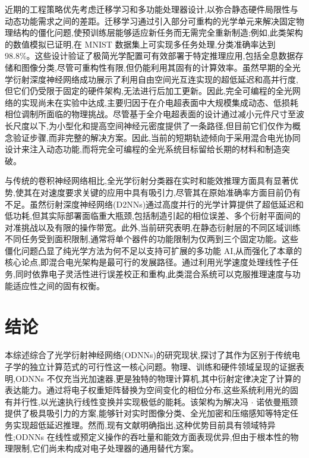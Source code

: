 近期的工程策略优先考虑迁移学习和多功能处理器设计,以弥合静态硬件局限性与动态功能需求之间的差距。迁移学习通过引入部分可重构的光学单元来解决固定物理结构的僵化问题,使预训练层能够适应新任务而无需完全重新制造;例如,此类架构的数值模拟已证明,在 MNIST 数据集上可实现多任务处理,分类准确率达到 98.8\%。这些设计验证了极简光学配置可有效部署于特定推理应用,包括全息数据存储和图像分类,尽管可重构性有限,但仍能利用其固有的计算效率。虽然早期的全光学衍射深度神经网络成功展示了利用自由空间光互连实现的超低延迟和高并行度,但它们仍受限于固定的硬件架构,无法进行后加工更新。因此,完全可编程的全光网络的实现尚未在实验中达成,主要归因于在介电超表面中大规模集成动态、低损耗相位调制所面临的物理挑战。尽管基于全介电超表面的设计通过减小元件尺寸至波长尺度以下,为小型化和提高空间神经元密度提供了一条路径,但目前它们仅作为概念验证步骤,而非完整的解决方案。因此,当前的短期轨迹倾向于采用混合电光协同设计来注入动态功能,而将完全可编程的全光系统目标留给长期的材料和制造突破。\citep{doi_10_1117_12_3109287_f4650a31} \citep{doi_10_3390_photonics11020145_68f5de58} \citep{doi_10_1364_josab_497148_b087424b} \citep{doi_10_1117_12_2688132_926a2697}

与传统的卷积神经网络相比,全光学衍射分类器在实时和能效推理方面具有显著优势,使其在对速度要求关键的应用中具有吸引力,尽管其在原始准确率方面目前仍有不足。虽然衍射深度神经网络(D2NNs)通过高度并行的光学计算提供了超低延迟和低功耗,但其实际部署面临重大瓶颈,包括制造引起的相位误差、多个衍射平面间的对准挑战以及有限的操作带宽。此外,当前研究表明,在静态衍射层的不同区域训练不同任务受到面积限制,通常将单个器件的功能限制为仅两到三个固定功能。这些僵化问题凸显了纯光学方法为何不足以支持可扩展的多功能 AI,从而强化了本章的核心论点,即混合电光架构是最可行的发展路径。通过利用光学速度处理线性子任务,同时依靠电子灵活性进行误差校正和重构,此类混合系统可以克服推理速度与功能适应性之间的固有权衡。\citep{doi_10_1364_ol_593231_ab93febc} \citep{doi_10_1364_oe_598903_731aaac1} \citep{doi_10_48550_arxiv_2411_05748_a91b6f61}

\section{结论}\label{ux7ed3ux8bba}

本综述综合了光学衍射神经网络(ODNNs)的研究现状,探讨了其作为区别于传统电子学的独立计算范式的可行性这一核心问题。物理、训练和硬件领域呈现的证据表明,ODNNs 不仅充当光加速器,更是独特的物理计算机,其中衍射定律决定了计算的表达能力。通过将电子权重矩阵替换为空间变化的相位分布,这些系统利用光的固有并行性,以光速执行线性变换并实现极低的能耗。该架构为解决冯 \(\cdot\) 诺依曼瓶颈提供了极具吸引力的方案,能够针对实时图像分类、全光加密和压缩感知等特定任务实现超低延迟推理。然而,现有文献明确指出,这种优势目前具有领域特异性;ODNNs 在线性或预定义操作的吞吐量和能效方面表现优异,但由于根本性的物理限制,它们尚未构成对电子处理器的通用替代方案。

